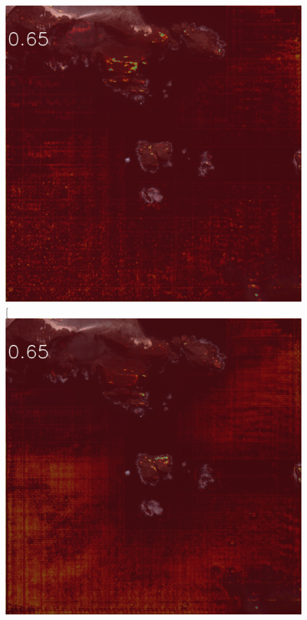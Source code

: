 \begin{figure}[h]
\includegraphics[width=\subFigx]{./fig/datagrow/MSE_single_unet_train_0_1.txt_bias-1_bs128_do0.1e25/orthoWV02_11FEB251253222-M1BS-1030010009092C00_u08rfAEAC.png}[
\includegraphics[width=\subFigx]{./fig/datagrow/MSE_single_unet_train_0_2.txt_bias-1_bs128_do0.1e25/orthoWV02_11FEB251253222-M1BS-1030010009092C00_u08rfAEAC.png}

\end{figure}
